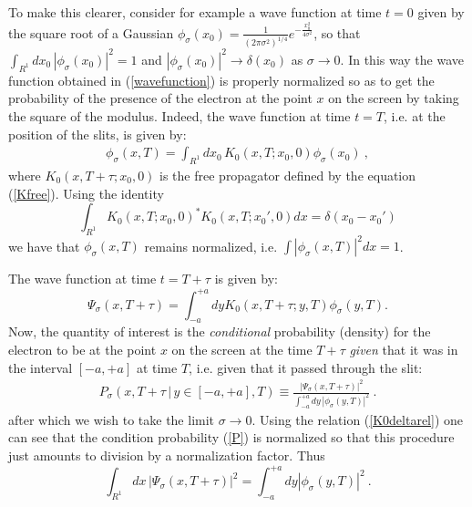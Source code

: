 \documentclass[12pt]{article}   %
\begin{document}
To make this clearer, consider for example a wave function at time
$t=0$ given by the square root of a Gaussian $\phi_\sigma(x_0) =
\frac{1}{(2\pi\sigma^2)^{1/4}} e^{-\frac{x_0^2}{4\sigma^2}}$, so
that $\int_{R^1} dx_0\,|\phi_\sigma(x_0)|^2 = 1$ and
$|\phi_\sigma(x_0)|^2 \rightarrow \delta(x_0)$ as $\sigma
\rightarrow 0$. In this way the wave function obtained in
(\ref{wavefunction}) is properly normalized so as to get the
probability of the presence of the electron at the point $x$ on
the screen by taking the square of the modulus. Indeed, the wave
function at time $t=T$, i.e. at the position of the slits, is
given by:
\begin{eqnarray}
\phi_\sigma(x,T) = \int_{R^1} dx_0\, K_0(x,T;x_0,0)
\phi_\sigma(x_0)\ ,
\end{eqnarray}
where  $K_0(x,T+\tau;x_0,0)$ is the free propagator defined by the
equation (\ref{Kfree}). Using the identity \begin{equation}
\label{K0deltarel}  \int_{R^1} K_0(x,T;x_0,0)^* K_0(x,T; x_0',0)
dx = \delta(x_0-x_0')
\end{equation} we have that $\phi_\sigma(x,T)$ remains normalized, i.e.
$\int |\phi_\sigma(x,T)|^2 dx = 1$.

The wave function at time $t=T+\tau$ is given by:
\begin{equation}
\Psi_\sigma(x,T+\tau) = \int_{-a}^{+a}dy
K_0(x,T+\tau;y,T)\phi_\sigma(y,T). \label{wavefunction}
\end{equation}
Now, the quantity of interest is the \textit{conditional}
probability (density) for the electron to be at the point $x$ on
the screen at the time $T+\tau$ \textit{given} that it was in the
interval $[-a,+a]$ at time $T$, i.e. given that it passed through
the slit:
\begin{eqnarray}\label{P}
P_\sigma\left(x,T+\tau \,|\,y\in [-a,+a],T\right) \equiv
\frac{|\Psi_\sigma(x,T+\tau)|^2}{\int_{-a}^{+a} dy\,
|\phi_\sigma(y,T)|^2}\ .
\end{eqnarray}
after which we wish to take the limit $\sigma\rightarrow0$. Using
the relation (\ref{K0deltarel}) one can see that the condition
probability (\ref{P}) is normalized so that this procedure just
amounts to division by a normalization factor. Thus
\begin{equation}\label{Z}
\int_{R^1} dx\, |\Psi_\sigma(x,T+\tau)|^2 = \int_{-a}^{+a}dy
|\phi_\sigma(y,T)|^2\ .
\end{equation}
\end{document}
